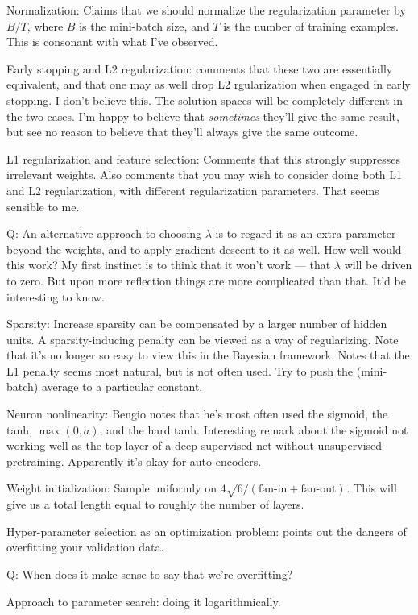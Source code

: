 \documentclass[12pt]{report}
\begin{document}
Normalization: Claims that we should normalize the regularization
parameter by $B / T$, where $B$ is the mini-batch size, and $T$ is the
number of training examples.  This is consonant with what I've
observed.

Early stopping and L2 regularization: comments that these two are
essentially equivalent, and that one may as well drop L2 rgularization
when engaged in early stopping.  I don't believe this.  The solution
spaces will be completely different in the two cases.  I'm happy to
believe that \emph{sometimes} they'll give the same result, but see no
reason to believe that they'll always give the same outcome.

L1 regularization and feature selection: Comments that this strongly
suppresses irrelevant weights.  Also comments that you may wish to
consider doing both L1 and L2 regularization, with different
regularization parameters.  That seems sensible to me.

Q: An alternative approach to choosing $\lambda$ is to regard it as an
extra parameter beyond the weights, and to apply gradient descent to
it as well.  How well would this work?  My first instinct is to think
that it won't work --- that $\lambda$ will be driven to zero.  But
upon more reflection things are more complicated than that.  It'd be
interesting to know.

Sparsity: Increase sparsity can be compensated by a larger number of
hidden units.  A sparsity-inducing penalty can be viewed as a way of
regularizing.  Note that it's no longer so easy to view this in the
Bayesian framework.  Notes that the L1 penalty seems most natural, but
is not often used.  Try to push the (mini-batch) average to a
particular constant.

Neuron nonlinearity: Bengio notes that he's most often used the
sigmoid, the tanh, $\max(0, a)$, and the hard tanh.  Interesting
remark about the sigmoid not working well as the top layer of a deep
supervised net without unsupervised pretraining.  Apparently it's okay
for auto-encoders.

Weight initialization: Sample uniformly on
$4\sqrt{6/(\mbox{fan-in}+\mbox{fan-out})}$.  This will give us a total
length equal to roughly the number of layers.

Hyper-parameter selection as an optimization problem: points out the
dangers of overfitting your validation data.

Q: When does it make sense to say that we're overfitting?

Approach to parameter search: doing it logarithmically.
\end{document}
